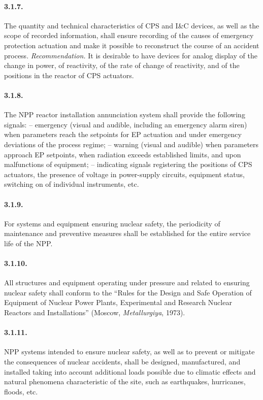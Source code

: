 \documentclass[openright]{bookest}
\begin{document}
\paragraph{3.1.7.} The quantity and technical characteristics of CPS and I\&C devices, as well as the scope of recorded information, shall ensure recording of the causes of emergency protection actuation and make it possible to reconstruct the course of an accident process.
\emph{Recommendation.} It is desirable to have devices for analog display of the change in power, of reactivity, of the rate of change of reactivity, and of the positions in the reactor of CPS actuators.

\paragraph{3.1.8.} The NPP reactor installation annunciation system shall provide the following signals:
-- emergency (visual and audible, including an emergency alarm siren) when parameters reach the setpoints for EP actuation and under emergency deviations of the process regime;
-- warning (visual and audible) when parameters approach EP setpoints, when radiation exceeds established limits, and upon malfunctions of equipment;
-- indicating signals registering the positions of CPS actuators, the presence of voltage in power-supply circuits, equipment status, switching on of individual instruments, etc.

\paragraph{3.1.9.} For systems and equipment ensuring nuclear safety, the periodicity of maintenance and preventive measures shall be established for the entire service life of the NPP.

\paragraph{3.1.10.} All structures and equipment operating under pressure and related to ensuring nuclear safety shall conform to the ``Rules for the Design and Safe Operation of Equipment of Nuclear Power Plants, Experimental and Research Nuclear Reactors and Installations'' (Moscow, \emph{Metallurgiya}, 1973).

\paragraph{3.1.11.} NPP systems intended to ensure nuclear safety, as well as to prevent or mitigate the consequences of nuclear accidents, shall be designed, manufactured, and installed taking into account additional loads possible due to climatic effects and natural phenomena characteristic of the site, such as earthquakes, hurricanes, floods, etc.
\end{document}
